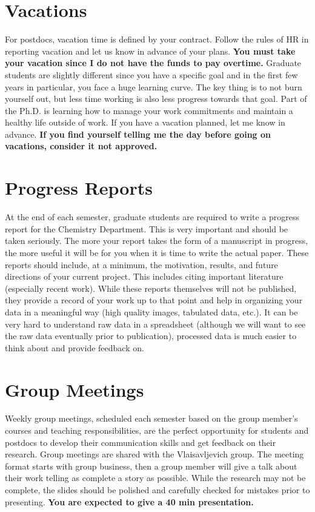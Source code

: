 \documentclass[letterpaper]{article}
\begin{document}
\section*{Vacations}
For postdocs, vacation time is defined by your contract. Follow the rules of HR in reporting vacation and let us know in advance of your plans. \textbf{You must take your vacation since I do not have the funds to pay overtime.} Graduate students are slightly different since you have a specific goal and in the first few years in particular, you face a huge learning curve. The key thing is to not burn yourself out, but less time working is also less progress towards that goal. Part of the Ph.D. is learning how to manage your work commitments and maintain a healthy life outside of work. If you have a vacation planned, let me know in advance. \textbf{If you find yourself telling me the day before going on vacations, consider it not approved.}  

\section*{Progress Reports}
At the end of each semester, graduate students are required to write a progress report for the Chemistry Department. This is very important and should be taken seriously. The more your report takes the form of a manuscript in progress, the more useful it will be for you when it is time to write the actual paper. These reports should include, at a minimum, the motivation, results, and future directions of your current project. This includes citing important literature (especially recent work). While these reports themselves will not be published, they provide a record of your work up to that point and help in organizing your data in a meaningful way (high quality images, tabulated data, etc.). It can be very hard to understand raw data in a spreadsheet (although we will want to see the raw data eventually prior to publication), processed data is much easier to think about and provide feedback on.\\

\section*{Group Meetings}
Weekly group meetings, scheduled each semester based on the group member's courses and teaching responsibilities, are the perfect opportunity for students and postdocs to develop their communication skills and get feedback on their research. Group meetings are shared with the Vlaisavljevich group. The meeting format starts with group business, then a group member will give a talk about their work telling as complete a story as possible. While the research may not be complete, the slides should be polished and carefully checked for mistakes prior to presenting. \textbf{You are expected to give a 40 min presentation.}\\
\end{document}
